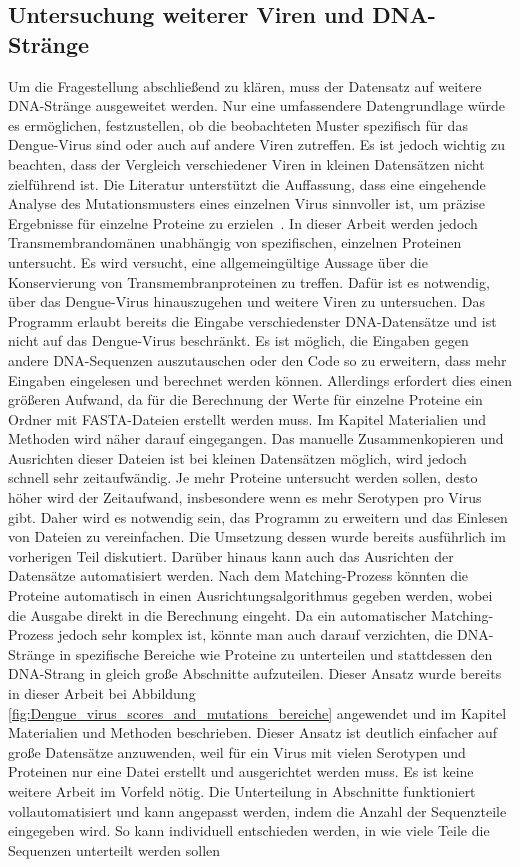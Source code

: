 \documentclass[german,version-2022-01]{uzl-thesis}
\begin{document}
\subsection{Untersuchung weiterer Viren und DNA-Str\"ange}
Um die Fragestellung abschlie\ss{}end zu kl\"aren, muss der Datensatz auf weitere DNA-Str\"ange ausgeweitet werden. Nur eine umfassendere Datengrundlage w\"urde es erm\"oglichen, festzustellen, ob die beobachteten Muster spezifisch f\"ur das Dengue-Virus sind oder auch auf andere Viren zutreffen. Es ist jedoch wichtig zu beachten, dass der Vergleich verschiedener Viren in kleinen Datens\"atzen nicht zielf\"uhrend ist. Die Literatur unterst\"utzt die Auffassung, dass eine eingehende Analyse des Mutationsmusters eines einzelnen Virus sinnvoller ist, um pr\"azise Ergebnisse f\"ur einzelne Proteine zu erzielen~\cite{nina}. In dieser Arbeit werden jedoch Transmembrandom\"anen unabh\"angig von spezifischen, einzelnen Proteinen untersucht. Es wird versucht, eine allgemeing\"ultige Aussage \"uber die Konservierung von Transmembranproteinen zu treffen. Daf\"ur ist es notwendig, \"uber das Dengue-Virus hinauszugehen und weitere Viren zu untersuchen. Das Programm erlaubt bereits die Eingabe verschiedenster DNA-Datens\"atze und ist nicht auf das Dengue-Virus beschr\"ankt. Es ist m\"oglich, die Eingaben gegen andere DNA-Sequenzen auszutauschen oder den Code so zu erweitern, dass mehr Eingaben eingelesen und berechnet werden k\"onnen. Allerdings erfordert dies einen gr\"o\ss{}eren Aufwand, da f\"ur die Berechnung der Werte f\"ur einzelne Proteine ein Ordner mit FASTA-Dateien erstellt werden muss. Im Kapitel Materialien und Methoden wird n\"aher darauf eingegangen. Das manuelle Zusammenkopieren und Ausrichten dieser Dateien ist bei kleinen Datens\"atzen m\"oglich, wird jedoch schnell sehr zeitaufw\"andig. Je mehr Proteine untersucht werden sollen, desto h\"oher wird der Zeitaufwand, insbesondere wenn es mehr Serotypen pro Virus gibt. Daher wird es notwendig sein, das Programm zu erweitern und das Einlesen von Dateien zu vereinfachen. Die Umsetzung dessen wurde bereits ausf\"uhrlich im vorherigen Teil diskutiert. Dar\"uber hinaus kann auch das Ausrichten der Datens\"atze automatisiert werden. Nach dem Matching-Prozess k\"onnten die Proteine automatisch in einen Ausrichtungsalgorithmus gegeben werden, wobei die Ausgabe direkt in die Berechnung eingeht. Da ein automatischer Matching-Prozess jedoch sehr komplex ist, k\"onnte man auch darauf verzichten, die DNA-Str\"ange in spezifische Bereiche wie Proteine zu unterteilen und stattdessen den DNA-Strang in gleich gro\ss{}e Abschnitte aufzuteilen. Dieser Ansatz wurde bereits in dieser Arbeit bei Abbildung \ref{fig:Dengue_virus_scores_and_mutations_bereiche} angewendet und im Kapitel Materialien und Methoden beschrieben. Dieser Ansatz ist deutlich einfacher auf gro\ss{}e Datens\"atze anzuwenden, weil f\"ur ein Virus mit vielen Serotypen und Proteinen nur eine Datei erstellt und ausgerichtet werden muss. Es ist keine weitere Arbeit im Vorfeld n\"otig. Die Unterteilung in Abschnitte funktioniert vollautomatisiert und kann angepasst werden, indem die Anzahl der Sequenzteile eingegeben wird. So kann individuell entschieden werden, in wie viele Teile die Sequenzen unterteilt werden sollen 
\end{document}

